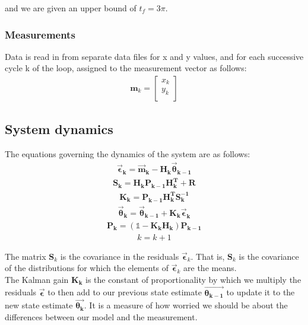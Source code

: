\documentclass[a4paper]{article}
\begin{document}
			\noindent and we are given an upper bound of $t_f=3\pi$.
			
		\subsubsection{Measurements}\label{Measurements}
			Data is read in from separate data files for x and y values, and for each successive cycle k of the loop, assigned to the measurement vector as follows:
			\begin{align}
				\bm{m}_k=
				\begin{bmatrix}
					x_k \\
					y_k \\
				\end{bmatrix}
			\end{align}

	\subsection{System dynamics}\label{System_dynamics}
	
		\noindent The equations governing the dynamics of the system are as follows:
			\begin{align}
				\bm{\vec{\epsilon}_k}=\bm{\vec{m}_k}-\bm{H_k\vec{\theta}_{k-1}}\label{Kalman_residuals}
			\end{align}
			\begin{align}
				\bm{S_k}=\bm{H_kP_{k-1}H_k^T} + \bm{R}
			\end{align}
			\begin{align}
				\bm{K_k}=\bm{P_{k-1}H_k^TS_k^{-1}}
			\end{align}
			\begin{align}
				\bm{\vec{\theta}_k}=\bm{\vec{\theta}_{k-1}}+\bm{K_k\vec{\epsilon}_k}
			\end{align}
			\begin{align}
				\bm{P_k}=(\bm{\mathds{1}}-\bm{K_kH_k})\bm{P_{k-1}}\label{Kalman_est_covariance}
			\end{align}
			\begin{align}
				k = k+1
			\end{align}
		
		\noindent The matrix $\bm{S}_k$ is the covariance in the residuals $\bm{\vec{\epsilon}}_k$. That is, $\bm{S}_k$ is the covariance of the distributions for which the elements of $\bm{\vec{\epsilon}}_k$ are the means. \\
		
		\noindent The Kalman gain $\bm{K_k}$ is the constant of proportionality by which we multiply the residuals $\bm{\vec{\epsilon}}$ to then add to our previous state estimate $\bm{\vec{\theta_{k-1}}}$ to update it to the new state estimate $\bm{\vec{\theta_{k}}}$. It is a measure of how worried we should be about the differences between our model and the measurement.\\
		
\end{document}
